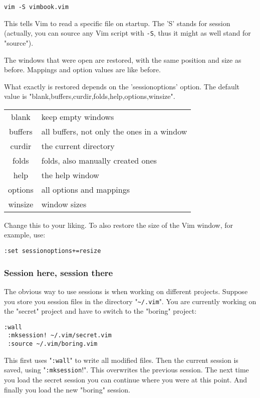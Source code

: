 \begin{Verbatim}[samepage=true]
 vim -S vimbook.vim
\end{Verbatim}

This tells Vim to read a specific file on startup.
The 'S' stands for session (actually, you can source any Vim script with \verb!-S!, thus it might as well stand for "source").

The windows that were open are restored, with the same position and size as before.
Mappings and option values are like before.

What exactly is restored depends on the 'sessionoptions' option.
The default value is "blank,buffers,curdir,folds,help,options,winsize".

\begin{center} \begin{longtable}{c l}
				blank & keep empty windows \\
				buffers & all buffers, not only the ones in a window \\
				curdir & the current directory \\
				folds & folds, also manually created ones \\
				help & the help window \\
				options & all options and mappings \\
				winsize & window sizes \\
\end{longtable} \end{center}
Change this to your liking.
To also restore the size of the Vim window, for example, use:

\begin{Verbatim}[samepage=true]
 :set sessionoptions+=resize
\end{Verbatim}
\subsubsection{Session here, session there}
The obvious way to use sessions is when working on different projects.
Suppose you store you session files in the directory "\verb!~/.vim!".
You are currently working on the "secret" project and have to switch to the "boring" project:

\begin{Verbatim}[samepage=true]
 :wall
 :mksession! ~/.vim/secret.vim
 :source ~/.vim/boring.vim
\end{Verbatim}

This first uses "\verb!:wall!" to write all modified files.
Then the current session is saved, using "\verb!:mksession!!".
This overwrites the previous session.
The next time you load the secret session you can continue where you were at this point.
And finally you load the new "boring" session.

